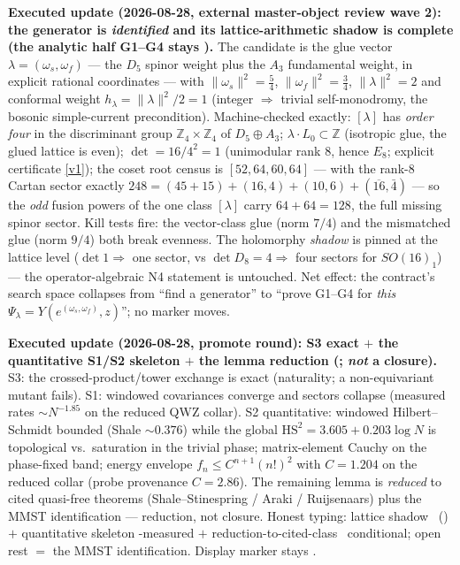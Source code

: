 \documentclass[11pt,a4paper]{article}
\begin{document}
\par\smallskip\noindent\textbf{Executed update (2026-08-28, external master-object review wave
2): the generator is \emph{identified} and its lattice-arithmetic shadow is complete
(the analytic half G1--G4 stays \mO).}
The
candidate is the glue vector $\lambda=(\omega_s,\omega_f)$ --- the $D_5$ spinor weight plus the
$A_3$ fundamental weight, in explicit rational coordinates --- with
$\|\omega_s\|^2=\tfrac54$, $\|\omega_f\|^2=\tfrac34$, $\|\lambda\|^2=2$ and conformal weight
$h_\lambda=\|\lambda\|^2/2=1$ (integer $\Rightarrow$ trivial self-monodromy, the bosonic
simple-current precondition).  Machine-checked exactly: $[\lambda]$ has \emph{order four} in
the discriminant group $\mathbb Z_4\times\mathbb Z_4$ of $D_5\oplus A_3$; $\lambda\cdot
L_0\subset\mathbb Z$ (isotropic glue, the glued lattice is even); $\det=16/4^2=1$ (unimodular
rank $8$, hence $E_8$; explicit certificate \vref{v1}); the coset root census is
$[52,64,60,64]$ --- with the rank-8 Cartan sector exactly
$248=(45{+}15)+(16,4)+(10,6)+(\overline{16},\bar 4)$ --- so the \emph{odd} fusion powers of the
one class $[\lambda]$ carry $64+64=128$, the full missing spinor sector.  Kill tests fire: the
vector-class glue (norm $7/4$) and the mismatched glue (norm $9/4$) both break evenness.  The
holomorphy \emph{shadow} is pinned at the lattice level ($\det 1\Rightarrow$ one sector, vs
$\det D_8=4\Rightarrow$ four sectors for $SO(16)_1$) --- the operator-algebraic N4 statement
is untouched.  Net effect: the contract's search space collapses from ``find a generator'' to
``prove G1--G4 for \emph{this} $\Psi_\lambda=Y(e^{(\omega_s,\omega_f)},z)$''; no marker moves.

\par\smallskip\noindent\textbf{Executed update (2026-08-28, promote round): S3 exact $+$ the
quantitative S1/S2 skeleton $+$ the lemma reduction
(; \emph{not} a
closure).}
S3: the crossed-product/tower exchange is exact (naturality; a non-equivariant mutant fails).
S1: windowed covariances converge and sectors collapse (measured rates $\sim N^{-1.85}$ on the
reduced QWZ collar).  S2 quantitative: windowed Hilbert--Schmidt bounded (Shale $\sim0.376$)
while the global $\mathrm{HS}^2=3.605+0.203\log N$ is topological vs.\ saturation in the
trivial phase; matrix-element Cauchy on the phase-fixed band; energy envelope
$f_n\le C^{n+1}(n!)^2$ with $C=1.204$ on the reduced collar (probe provenance $C=2.86$).
The remaining lemma is \emph{reduced} to cited quasi-free theorems (Shale--Stinespring / Araki /
Ruijsenaars) plus the MMST identification --- reduction, not closure.  Honest typing: lattice
shadow \mE\ () $+$
quantitative skeleton \mE-measured $+$ reduction-to-cited-class \mC\ conditional; open rest $=$
the MMST identification.  Display marker stays \mO.
\end{document}

